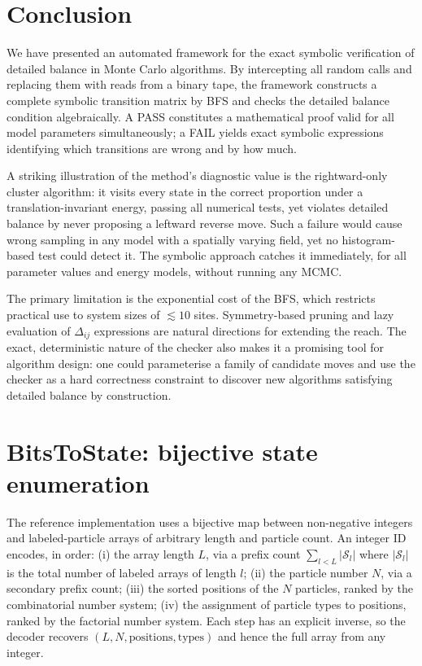 \documentclass[twocolumn,10pt]{article}
\begin{document}
\section{Conclusion}

We have presented an automated framework for the exact symbolic verification of
detailed balance in Monte Carlo algorithms.  By intercepting all random calls
and replacing them with reads from a binary tape, the framework constructs a
complete symbolic transition matrix by BFS and checks the detailed balance
condition algebraically.  A PASS constitutes a mathematical proof valid for all
model parameters simultaneously; a FAIL yields exact symbolic expressions
identifying which transitions are wrong and by how much.

A striking illustration of the method's diagnostic value is the rightward-only
cluster algorithm: it visits every state in the correct proportion under a
translation-invariant energy, passing all numerical tests, yet violates detailed
balance by never proposing a leftward reverse move.  Such a failure would cause
wrong sampling in any model with a spatially varying field, yet no histogram-based
test could detect it.  The symbolic approach catches it immediately, for all
parameter values and energy models, without running any MCMC.

The primary limitation is the exponential cost of the BFS, which restricts
practical use to system sizes of $\lesssim10$ sites.  Symmetry-based pruning and
lazy evaluation of $\Delta_{ij}$ expressions are natural directions for extending
the reach.  The exact, deterministic nature of the checker also makes it a
promising tool for algorithm design: one could parameterise a family of candidate
moves and use the checker as a hard correctness constraint to discover new
algorithms satisfying detailed balance by construction.

\appendix

\section{BitsToState: bijective state enumeration}
\label{app:bitstostate}

The reference implementation uses a bijective map between non-negative integers
and labeled-particle arrays of arbitrary length and particle count.  An integer
ID encodes, in order: (i) the array length $L$, via a prefix count
$\sum_{l<L}|\mathcal{S}_l|$ where $|\mathcal{S}_l|$ is the total number of
labeled arrays of length $l$; (ii) the particle number $N$, via a secondary
prefix count; (iii) the sorted positions of the $N$ particles, ranked by the
combinatorial number system; (iv) the assignment of particle types to positions,
ranked by the factorial number system.  Each step has an explicit inverse, so
the decoder recovers $(L,N,\text{positions},\text{types})$ and hence the full
array from any integer.
\end{document}
